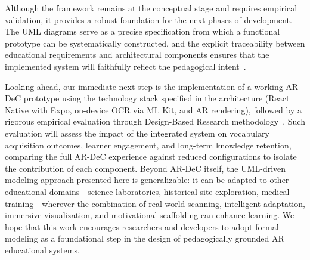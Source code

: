 Although the framework remains at the conceptual stage and requires empirical validation, it provides a robust foundation for the next phases of development. The UML diagrams serve as a precise specification from which a functional prototype can be systematically constructed, and the explicit traceability between educational requirements and architectural components ensures that the implemented system will faithfully reflect the pedagogical intent~\cite{Ouariach2025,Ouariach2026}.

Looking ahead, our immediate next step is the implementation of a working AR-DeC prototype using the technology stack specified in the architecture (React Native with Expo, on-device OCR via ML Kit, and AR rendering), followed by a rigorous empirical evaluation through Design-Based Research methodology~\cite{Crompton2017}. Such evaluation will assess the impact of the integrated system on vocabulary acquisition outcomes, learner engagement, and long-term knowledge retention, comparing the full AR-DeC experience against reduced configurations to isolate the contribution of each component. Beyond AR-DeC itself, the UML-driven modeling approach presented here is generalizable: it can be adapted to other educational domains---science laboratories, historical site exploration, medical training---wherever the combination of real-world scanning, intelligent adaptation, immersive visualization, and motivational scaffolding can enhance learning. We hope that this work encourages researchers and developers to adopt formal modeling as a foundational step in the design of pedagogically grounded AR educational systems.
